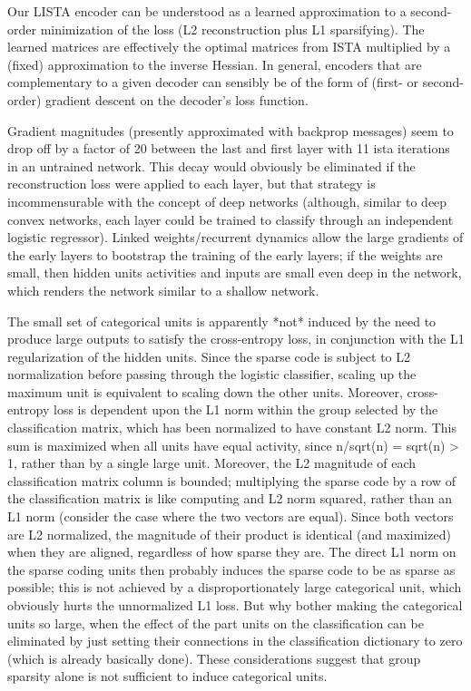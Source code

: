 Our LISTA encoder can be understood as a learned approximation to a second-order minimization of the loss (L2 reconstruction plus L1 sparsifying).  The learned matrices are effectively the optimal matrices from ISTA multiplied by a (fixed) approximation to the inverse Hessian.  In general, encoders that are complementary to a given decoder can sensibly be of the form of (first- or second-order) gradient descent on the decoder's loss function. 

Gradient magnitudes (presently approximated with backprop messages) seem to drop off by a factor of 20 between the last and first layer with 11 ista iterations in an untrained network.  This decay would obviously be eliminated if the reconstruction loss were applied to each layer, but that strategy is incommensurable with the concept of deep networks (although, similar to deep convex networks, each layer could be trained to classify through an independent logistic regressor).  Linked weights/recurrent dynamics allow the large gradients of the early layers to bootstrap the training of the early layers; if the weights are small, then hidden units activities and inputs are small even deep in the network, which renders the network similar to a shallow network.

The small set of categorical units is apparently *not* induced by the need to produce large outputs to satisfy the cross-entropy loss, in conjunction with the L1 regularization of the hidden units.  Since the sparse code is subject to L2 normalization before passing through the logistic classifier, scaling up the maximum unit is equivalent to scaling down the other units.  Moreover, cross-entropy loss is dependent upon the L1 norm within the group selected by the classification matrix, which has been normalized to have constant L2 norm.  This sum is maximized when all units have equal activity, since n/sqrt(n) = sqrt(n) > 1, rather than by a single large unit.  Moreover, the L2 magnitude of each classification matrix column is bounded; multiplying the sparse code by a row of the classification matrix is like computing and L2 norm squared, rather than an L1 norm (consider the case where the two vectors are equal).  Since both vectors are L2 normalized, the magnitude of their product is identical (and maximized) when they are aligned, regardless of how sparse they are.  The direct L1 norm on the sparse coding units then probably induces the sparse code to be as sparse as possible; this is not achieved by a disproportionately large categorical unit, which obviously hurts the unnormalized L1 loss.  But why bother making the categorical units so large, when the effect of the part units on the classification can be eliminated by just setting their connections in the classification dictionary to zero (which is already basically done).  These considerations suggest that group sparsity alone is not sufficient to induce categorical units.

